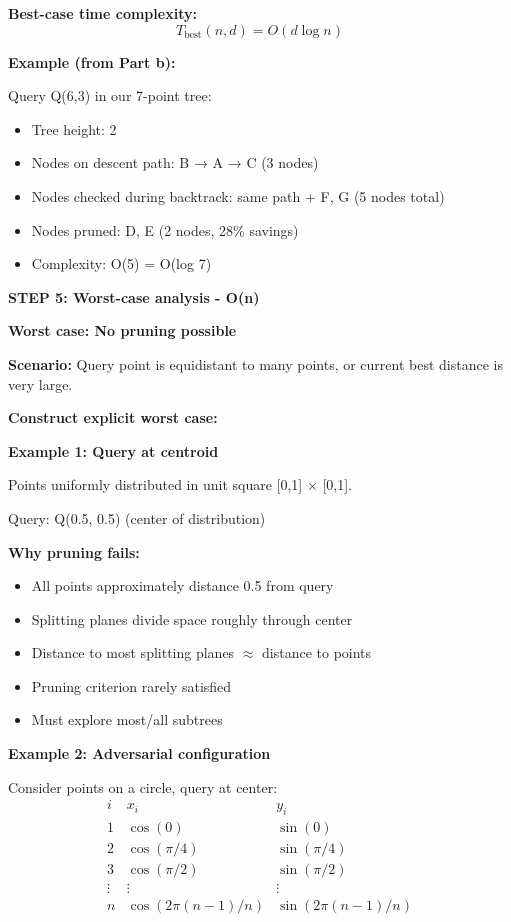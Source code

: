 \documentclass[12pt]{article}
\begin{document}
\begin{solution}
\textbf{Best-case time complexity:}
\[
T_{\text{best}}(n, d) = O(d \log n)
\]

\textbf{Example (from Part b):}

Query Q(6,3) in our 7-point tree:
\begin{itemize}
    \item Tree height: 2
    \item Nodes on descent path: B → A → C (3 nodes)
    \item Nodes checked during backtrack: same path + F, G (5 nodes total)
    \item Nodes pruned: D, E (2 nodes, 28\% savings)
    \item Complexity: O(5) = O(log 7) \checkmark
\end{itemize}

\textbf{STEP 5: Worst-case analysis - O(n)}

\textbf{Worst case: No pruning possible}

\textbf{Scenario:} Query point is equidistant to many points, or current best distance is very large.

\textbf{Construct explicit worst case:}

\textbf{Example 1: Query at centroid}

Points uniformly distributed in unit square [0,1] × [0,1].

Query: Q(0.5, 0.5) (center of distribution)

\textbf{Why pruning fails:}
\begin{itemize}
    \item All points approximately distance 0.5 from query
    \item Splitting planes divide space roughly through center
    \item Distance to most splitting planes $\approx$ distance to points
    \item Pruning criterion rarely satisfied
    \item Must explore most/all subtrees
\end{itemize}

\textbf{Example 2: Adversarial configuration}

Consider points on a circle, query at center:
\[
\begin{array}{c|cc}
i & x_i & y_i \\
\hline
1 & \cos(0) & \sin(0) \\
2 & \cos(\pi/4) & \sin(\pi/4) \\
3 & \cos(\pi/2) & \sin(\pi/2) \\
\vdots & \vdots & \vdots \\
n & \cos(2\pi(n-1)/n) & \sin(2\pi(n-1)/n) \\
\end{array}
\]


\end{solution}
\end{document}
